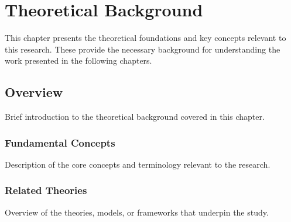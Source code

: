\chapter{Theoretical Background}
\label{chap:theory}

This chapter presents the theoretical foundations and key concepts relevant to this research. These provide the necessary background for understanding the work presented in the following chapters.

\section{Overview}
Brief introduction to the theoretical background covered in this chapter.

\subsection{Fundamental Concepts}
Description of the core concepts and terminology relevant to the research.

\subsection{Related Theories}
Overview of the theories, models, or frameworks that underpin the study.



